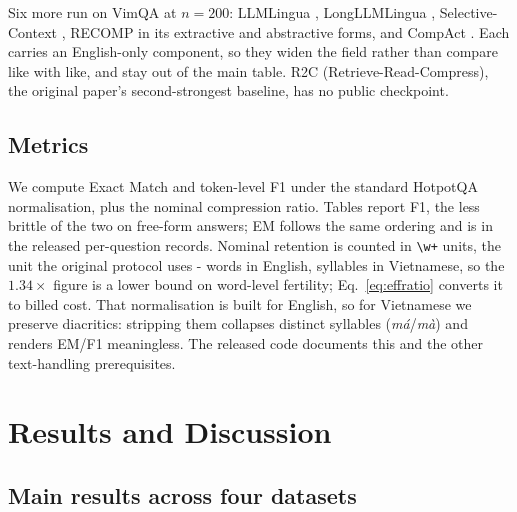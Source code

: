 \documentclass{llncs}
\begin{document}
Six more run on VimQA at $n=200$: LLMLingua \cite{jiang2023llmlingua},
LongLLMLingua \cite{jiang2024longllmlingua}, Selective-Context
\cite{li2023selectivecontext}, RECOMP \cite{xu2024recomp} in its extractive and
abstractive forms, and CompAct \cite{yoon2024compact}. Each carries an English-only component, so they widen the
field rather than compare like with like, and stay out of the main table. R2C (Retrieve-Read-Compress),
the original paper's second-strongest baseline, has no public checkpoint.

\subsection{Metrics}
We compute Exact Match and token-level F1 under the standard HotpotQA
normalisation, plus the nominal compression ratio. Tables report F1, the less
brittle of the two on free-form answers; EM follows the same ordering and is in
the released per-question records. Nominal retention is counted in \texttt{\textbackslash w+} units, the unit
the original protocol uses - words in English, syllables in Vietnamese, so the
$1.34\times$ figure is a lower bound on word-level fertility;
Eq.~\ref{eq:effratio} converts it to billed cost. That normalisation is built for English, so for Vietnamese we
preserve diacritics: stripping them collapses distinct syllables
(\emph{má}/\emph{mà}) and renders EM/F1 meaningless. The released code
documents this and the other text-handling prerequisites.

\section{Results and Discussion}
\label{sec:results}

\subsection{Main results across four datasets}
\label{sec:main}
\end{document}
